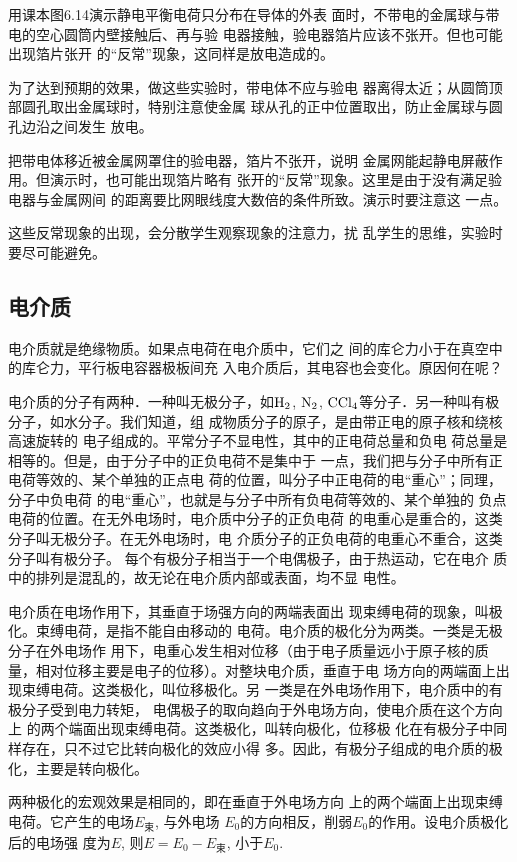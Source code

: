 用课本图6.14演示静电平衡电荷只分布在导体的外表
面时，不带电的金属球与带电的空心圆筒内壁接触后、再与验
电器接触，验电器箔片应该不张开。但也可能出现箔片张开
的“反常”现象，这同样是放电造成的。

为了达到预期的效果，做这些实验时，带电体不应与验电
器离得太近；从圆筒顶部圆孔取出金属球时，特别注意使金属
球从孔的正中位置取出，防止金属球与圆孔边沿之间发生
放电。

把带电体移近被金属网罩住的验电器，箔片不张开，说明
金属网能起静电屏蔽作用。但演示时，也可能出现箔片略有
张开的“反常”现象。这里是由于没有满足验电器与金属网间
的距离要比网眼线度大数倍的条件所致。演示时要注意这
一点。

这些反常现象的出现，会分散学生观察现象的注意力，扰
乱学生的思维，实验时要尽可能避免。

\subsection{电介质}
电介质就是绝缘物质。如果点电荷在电介质中，它们之
间的库仑力小于在真空中的库仑力，平行板电容器极板间充
入电介质后，其电容也会变化。原因何在呢？

电介质的分子有两种．一种叫无极分子，如$\rm H_2$, $\rm N_2$,
$\rm CCl_4$等分子．另一种叫有极分子，如水分子。我们知道，组
成物质分子的原子，是由带正电的原子核和绕核高速旋转的
电子组成的。平常分子不显电性，其中的正电荷总量和负电
荷总量是相等的。但是，由于分子中的正负电荷不是集中于
一点，我们把与分子中所有正电荷等效的、某个单独的正点电
荷的位置，叫分子中正电荷的电“重心”；同理，分子中负电荷
的电“重心”，也就是与分子中所有负电荷等效的、某个单独的
负点电荷的位置。在无外电场时，电介质中分子的正负电荷
的电重心是重合的，这类分子叫无极分子。在无外电场时，电
介质分子的正负电荷的电重心不重合，这类分子叫有极分子。
每个有极分子相当于一个电偶极子，由于热运动，它在电介
质中的排列是混乱的，故无论在电介质内部或表面，均不显
电性。

电介质在电场作用下，其垂直于场强方向的两端表面出
现束缚电荷的现象，叫极化。束缚电荷，是指不能自由移动的
电荷。电介质的极化分为两类。一类是无极分子在外电场作
用下，电重心发生相对位移（由于电子质量远小于原子核的质
量，相对位移主要是电子的位移）。对整块电介质，垂直于电
场方向的两端面上出现束缚电荷。这类极化，叫位移极化。另
一类是在外电场作用下，电介质中的有极分子受到电力转矩，
电偶极子的取向趋向于外电场方向，使电介质在这个方向上
的两个端面出现束缚电荷。这类极化，叫转向极化，位移极
化在有极分子中同样存在，只不过它比转向极化的效应小得
多。因此，有极分子组成的电介质的极化，主要是转向极化。

两种极化的宏观效果是相同的，即在垂直于外电场方向
上的两个端面上出现束缚电荷。它产生的电场$E_{\text{束}}$, 与外电场
$E_0$的方向相反，削弱$E_0$的作用。设电介质极化后的电场强
度为$E$, 则$E=E_0-E_{\text{束}}$, 小于$E_0$.

